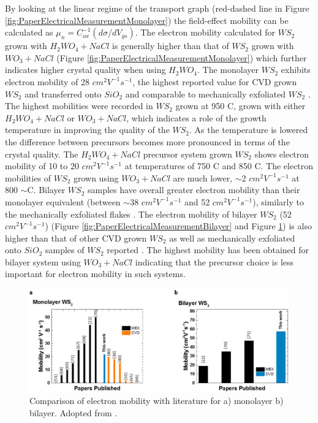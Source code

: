 By looking at the linear regime of the transport graph (red-dashed line in Figure \ref{fig:PaperElectricalMeasurementMonolayer}) the field-effect mobility can be calculated as ${\mu}_n=C_{ox}^{-1}(d{\sigma}/dV_{gs})$. The electron mobility calculated for $WS_2$ grown with $H_2WO_4 + NaCl$ is generally higher than that of $WS_2$ grown with $WO_3 + NaCl$ (Figure \ref{fig:PaperElectricalMeasurementMonolayer}) which further indicates higher crystal quality when using $H_2WO_4$. The monolayer $WS_2$ exhibits electron mobility of 28 $cm^2 V^{-1} s^{-1}$, the highest reported value for CVD grown $WS_2$ and transferred onto $SiO_2$ \cite{Li2015}\cite{Kang2015}\cite{Gao2015}\cite{doi:10.1021/nn403454e}\cite{doi:10.1021/acsnano.5b01480}\cite{Lee2013}\cite{Yun2015}\cite{Alharbi2016}\cite{Lan2015}\cite{Hussain2013}\cite{Cui2015} and comparable to mechanically exfoliated $WS_2$ \cite{Withers2014}\cite{Iqbal2016}\cite{Georgiou2014}\cite{Iqbal2015a}. The highest mobilities were recorded in $WS_2$ grown at 950 {\degree}C, grown with either $H_2WO_4 + NaCl$ or $WO_3 + NaCl$, which indicates a role of the growth temperature in improving the quality of the $WS_2$. As the temperature is lowered the difference between precursors becomes more pronounced in terms of the crystal quality. The $H_2WO_4 + NaCl$ precursor system grown $WS_2$ shows electron mobility of 10 to 20 $cm^2 V^{-1} s^{-1}$ at temperatures of 750 {\degree}C and 850 {\degree}C. The electron mobilities of $WS_2$ grown using $WO_3 + NaCl$ are much lower, {$\sim$}2 $cm^2 V^{-1} s^{-1}$ at 800 $\sim$C. Bilayer $WS_2$ samples have overall greater electron mobility than their monolayer equivalent (between {$\sim$}38 $cm^2 V^{-1} s^{-1}$ and 52 $cm^2 V^{-1} s^{-1}$), similarly to the mechanically exfoliated flakes \cite{Ovchinnikov2014}\cite{Iqbal2015a}. The electron mobility of bilayer $WS_2$ (52 $cm^2 V^{-1} s^{-1}$) (Figure \ref{fig:PaperElectricalMeasurementBilayer} and Figure \ref{fig:PaperMobilityComparison}) is also higher than that of other CVD grown $WS_2$ as well as mechanically exfoliated onto $SiO_2$ samples of $WS_2$ reported  \cite{Iqbal2015}\cite{Ovchinnikov2014}\cite{Iqbal2015a}. The highest mobility has been obtained for bilayer system using $WO_3 + NaCl$ indicating that the precursor choice is less important for electron mobility in such systems. 

\begin{figure}[h]
	\begin{center}
		\includegraphics[scale=0.4]{PaperMobilityComparison.png}
		\caption{Comparison of electron mobility with literature for a) monolayer b) bilayer. Adopted from \cite{Reale2017}.}
		\label{fig:PaperMobilityComparison}
	\end{center}
\end{figure}
 
